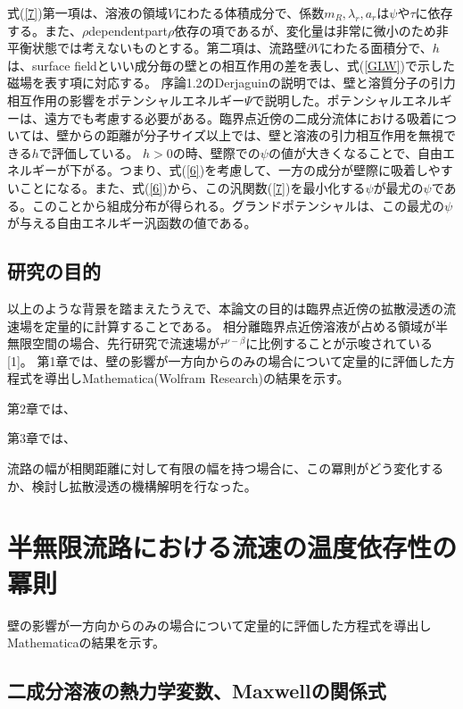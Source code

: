 \documentclass[a4paper,12pt, oneside, openany]{jsbook}
\begin{document}
式(\ref{7})第一項は、溶液の領域$V$にわたる体積成分で、係数$m_R,\lambda_r,a_r$は$\psi$や$\tau$に依存する。また、$\rho$dependentpart$\rho$依存の項であるが、変化量は非常に微小のため非平衡状態では考えないものとする。第二項は、流路壁$\partial{V}$にわたる面積分で、$h$は、surface fieldといい成分毎の壁との相互作用の差を表し、式(\ref{GLW})で示した磁場を表す項に対応する。
序論1.2のDerjaguinの説明では、壁と溶質分子の引力相互作用の影響をポテンシャルエネルギー$\Psi$で説明した。ポテンシャルエネルギーは、遠方でも考慮する必要がある。臨界点近傍の二成分流体における吸着については、壁からの距離が分子サイズ以上では、壁と溶液の引力相互作用を無視できる$h$で評価している。
$h>0$の時、壁際での$\psi$の値が大きくなることで、自由エネルギーが下がる。つまり、式(\ref{6})を考慮して、一方の成分が壁際に吸着しやすいことになる。また、式(\ref{6})から、この汎関数(\ref{7})を最小化する$\psi$が最尤の$\psi$である。このことから組成分布が得られる。グランドポテンシャルは、この最尤の$\psi$が与える自由エネルギー汎函数の値である。


\section{研究の目的}
以上のような背景を踏まえたうえで、本論文の目的は臨界点近傍の拡散浸透の流速場を定量的に計算することである。
相分離臨界点近傍溶液が占める領域が半無限空間の場合、先行研究で流速場が$\tau^{\nu-\beta}$に比例することが示唆されている[1]。
第1章では、壁の影響が一方向からのみの場合について定量的に評価した方程式を導出しMathematica(Wolfram Research)の結果を示す。

第2章では、

第3章では、

流路の幅が相関距離に対して有限の幅を持つ場合に、この冪則がどう変化するか、検討し拡散浸透の機構解明を行なった。


\newpage
\chapter{半無限流路における流速の温度依存性の冪則}
\noindent 壁の影響が一方向からのみの場合について定量的に評価した方程式を導出しMathematicaの結果を示す。
\section{二成分溶液の熱力学変数、Maxwellの関係式}
\end{document}
